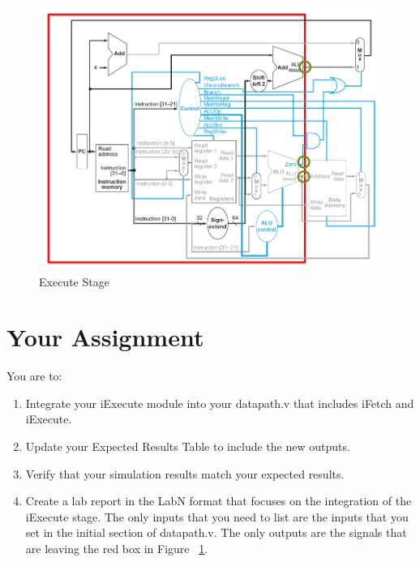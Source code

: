 \begin{figure}
	\caption{Execute Stage}\label{fig:integrated_execute}
	\begin{center}
		\includegraphics[width=4.75in]{../images/integrated_execute.png}
	\end{center}
\end{figure} 

\section{Your Assignment}

You are to:
\begin{enumerate}
\item Integrate your iExecute module into your datapath.v that includes iFetch and iExecute.
\item Update your Expected Results Table to include the new outputs.
\item Verify that your simulation results match your expected results.
\item Create a lab report in the LabN format that focuses on the integration of the iExecute stage.  The only inputs that you need to list are the inputs that you set in the initial section of datapath.v.  The only outputs are the signals that are leaving the red box in Figure ~\ref{fig:integrated_execute}. 
\end{enumerate}